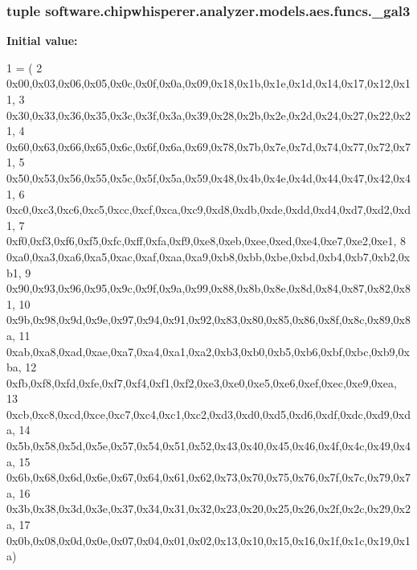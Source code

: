 \subsubsection[{\+\_\+gal3}]{\setlength{\rightskip}{0pt plus 5cm}tuple software.\+chipwhisperer.\+analyzer.\+models.\+aes.\+funcs.\+\_\+gal3}\label{namespacesoftware_1_1chipwhisperer_1_1analyzer_1_1models_1_1aes_1_1funcs_aba18ee6f1cc18346b126e33d89a159bd}
{\bfseries Initial value\+:}
\begin{DoxyCode}
1 = (
2 0x00,0x03,0x06,0x05,0x0c,0x0f,0x0a,0x09,0x18,0x1b,0x1e,0x1d,0x14,0x17,0x12,0x11,
3 0x30,0x33,0x36,0x35,0x3c,0x3f,0x3a,0x39,0x28,0x2b,0x2e,0x2d,0x24,0x27,0x22,0x21,
4 0x60,0x63,0x66,0x65,0x6c,0x6f,0x6a,0x69,0x78,0x7b,0x7e,0x7d,0x74,0x77,0x72,0x71,
5 0x50,0x53,0x56,0x55,0x5c,0x5f,0x5a,0x59,0x48,0x4b,0x4e,0x4d,0x44,0x47,0x42,0x41,
6 0xc0,0xc3,0xc6,0xc5,0xcc,0xcf,0xca,0xc9,0xd8,0xdb,0xde,0xdd,0xd4,0xd7,0xd2,0xd1,
7 0xf0,0xf3,0xf6,0xf5,0xfc,0xff,0xfa,0xf9,0xe8,0xeb,0xee,0xed,0xe4,0xe7,0xe2,0xe1,
8 0xa0,0xa3,0xa6,0xa5,0xac,0xaf,0xaa,0xa9,0xb8,0xbb,0xbe,0xbd,0xb4,0xb7,0xb2,0xb1,
9 0x90,0x93,0x96,0x95,0x9c,0x9f,0x9a,0x99,0x88,0x8b,0x8e,0x8d,0x84,0x87,0x82,0x81,
10 0x9b,0x98,0x9d,0x9e,0x97,0x94,0x91,0x92,0x83,0x80,0x85,0x86,0x8f,0x8c,0x89,0x8a,
11 0xab,0xa8,0xad,0xae,0xa7,0xa4,0xa1,0xa2,0xb3,0xb0,0xb5,0xb6,0xbf,0xbc,0xb9,0xba,
12 0xfb,0xf8,0xfd,0xfe,0xf7,0xf4,0xf1,0xf2,0xe3,0xe0,0xe5,0xe6,0xef,0xec,0xe9,0xea,
13 0xcb,0xc8,0xcd,0xce,0xc7,0xc4,0xc1,0xc2,0xd3,0xd0,0xd5,0xd6,0xdf,0xdc,0xd9,0xda,
14 0x5b,0x58,0x5d,0x5e,0x57,0x54,0x51,0x52,0x43,0x40,0x45,0x46,0x4f,0x4c,0x49,0x4a,
15 0x6b,0x68,0x6d,0x6e,0x67,0x64,0x61,0x62,0x73,0x70,0x75,0x76,0x7f,0x7c,0x79,0x7a,
16 0x3b,0x38,0x3d,0x3e,0x37,0x34,0x31,0x32,0x23,0x20,0x25,0x26,0x2f,0x2c,0x29,0x2a,
17 0x0b,0x08,0x0d,0x0e,0x07,0x04,0x01,0x02,0x13,0x10,0x15,0x16,0x1f,0x1c,0x19,0x1a)
\end{DoxyCode}
\hypertarget{namespacesoftware_1_1chipwhisperer_1_1analyzer_1_1models_1_1aes_1_1funcs_a2011fe4ad200e73bf8707fd98e2f74fb}{}
